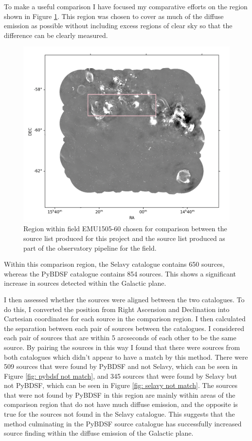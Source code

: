 To make a useful comparison I have focused my comparative efforts on the region shown in Figure \ref{fig: comparison_blank}. This region was chosen to cover as much of the diffuse emission as possible without including excess regions of clear sky so that the difference can be clearly measured.

\begin{figure}

\includegraphics[width=0.9\linewidth]{Thesis_Template/Figures/comparison region.png}
\caption{\small Region within field EMU1505-60 chosen for comparison between the source list produced for this project and the source list produced as part of the observatory pipeline for the field.}
\label{fig: comparison_blank}
\end{figure}

Within this comparison region, the Selavy catalogue contains 650 sources, whereas the PyBDSF catalogue contains 854 sources. This shows a significant increase in sources detected within the Galactic plane.

I then assessed whether the sources were aligned between the two catalogues. To do this, I converted the position from Right Ascension and Declination into Cartesian coordinates for each source in the comparison region. I then calculated the separation between each pair of sources between the catalogues. I considered each pair of sources that are within 5 arcseconds of each other to be the same source. By pairing the sources in this way I found that there were sources from both catalogues which didn't appear to have a match by this method. There were 509 sources that were found by PyBDSF and not Selavy, which can be seen in Figure \ref{fig: pybdsf not match}, and 345 sources that were found by Selavy but not PyBDSF, which can be seen in Figure \ref{fig: selavy not match}. The sources that were not found by PyBDSF in this region are mainly within areas of the comparison region that do not have much diffuse emission, and the opposite is true for the sources not found in the Selavy catalogue. This suggests that the method culminating in the PyBDSF source catalogue has successfully increased source finding within the diffuse emission of the Galactic plane.

